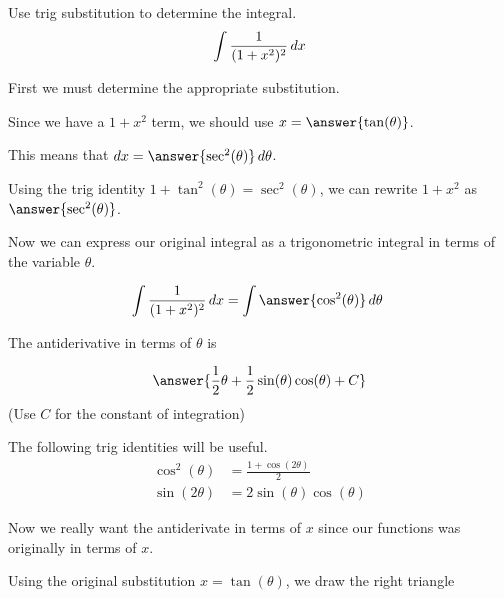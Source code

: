 \documentclass{ximera}
\author{Jason Miller}
\begin{document}
\begin{exercise}
Use trig substitution to determine the integral.
\[
\int \frac{1}{(1+x^{2})^{2}} \mathop{}\!d x
\]

First we must determine the appropriate substitution. 

Since we have a $1+x^{2}$ term, we should use $x=\answer{\tan(\theta)}$. 

This means that $\d x= \answer{ \sec^{2}(\theta)} \d \theta$. 

\begin{exercise}
Using the trig identity $1+\tan^{2}(\theta)=\sec^{2}(\theta)$, we can rewrite $1+x^{2}$ as $\answer{\sec^{2}(\theta)}$. 

Now we can express our original integral as a trigonometric integral in terms of the variable $\theta$. 

\[
\int \frac{1}{(1+x^{2})^{2}} \d x= \int \answer{ \cos^{2}(\theta)} \d \theta\
\]

The antiderivative in terms of $\theta$ is 

\[
\answer{ \frac{1}{2}\theta + \frac{1}{2}\sin(\theta)\cos(\theta) + C}
\]
(Use $C$ for the constant of integration)

\begin{hint}
The following trig identities will be useful.
\begin{align}
\cos^{2}(\theta)&=\frac{1+\cos(2\theta)}{2} \\
\sin(2\theta)&=2\sin(\theta)\cos(\theta)
\end{align}
\end{hint}

Now we really want the antiderivate in terms of $x$ since our functions was originally in terms of $x$. 

\begin{exercise}
Using the original substitution $x=\tan(\theta)$, we draw the right triangle 

    \begin{image}
    \end{image}


\end{exercise}
\end{exercise}
\end{exercise}
\end{document}
